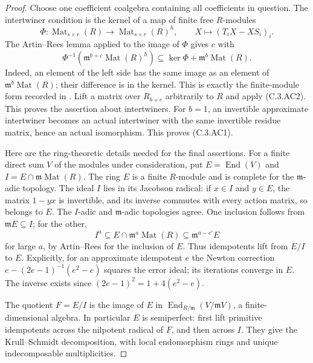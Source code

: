 \begin{proof}
Choose one coefficient coalgebra containing all coefficients in
question.  The intertwiner condition is the kernel of a map of
finite free $R$-modules
\[
 \Phi:\operatorname{Mat}_{s\times r}(R)
       \longrightarrow\operatorname{Mat}_{s\times r}(R)^h,
       \qquad X\longmapsto(T_iX-XS_i)_i.
\]
The Artin--Rees lemma applied to the image of $\Phi$ gives $c$ with
\[
 \Phi^{-1}(\mathfrak m^{b+c}\operatorname{Mat}(R)^h)
       \subseteq\ker\Phi+\mathfrak m^b\operatorname{Mat}(R).
                                                               \tag{C.3.AC2}
\]
Indeed, an element of the left side has the same image as an
element of $\mathfrak m^b\operatorname{Mat}(R)$; their difference
is in the kernel.  This is exactly the finite-module form recorded
in \cite[Section 15.4, Tag 07VD, introductory Artin--Rees
inclusion]{C-CompleteArtinRees}.
Lift a matrix over $R_{b+c}$ arbitrarily to $R$ and apply
(C.3.AC2).  This proves the assertion about intertwiners.
For $b=1$, an invertible approximate intertwiner becomes an
actual intertwiner with the same invertible residue matrix,
hence an actual isomorphism.  This proves (C.3.AC1).

Here are the ring-theoretic details needed for the final assertions.
For a finite direct sum $V$ of the modules under consideration, put
$E=\operatorname{End}(V)$ and
$I=E\cap\mathfrak m\operatorname{Mat}(R)$.
The ring $E$ is a finite $R$-module and is complete for the
$\mathfrak m$-adic topology.  The ideal $I$ lies in its Jacobson
radical: if $x\in I$ and $y\in E$, the matrix $1-yx$ is invertible,
and its inverse commutes with every action matrix, so belongs to
$E$.  The $I$-adic and $\mathfrak m$-adic topologies agree.  One
inclusion follows from $\mathfrak mE\subseteq I$; for the other,
\[
 I^a\subseteq E\cap\mathfrak m^a\operatorname{Mat}(R)
                  \subseteq\mathfrak m^{a-c'}E
\]
for large $a$, by Artin--Rees for the inclusion of $E$.
Thus idempotents lift from $E/I$ to $E$.  Explicitly, for an
approximate idempotent $e$ the Newton correction
$e-(2e-1)^{-1}(e^2-e)$ squares the error ideal; its iterations
converge in $E$.  The inverse exists since
$(2e-1)^2=1+4(e^2-e)$.

The quotient $F=E/I$ is the image of $E$ in
$\operatorname{End}_{R/\mathfrak m}(V/\mathfrak mV)$,
a finite-dimensional algebra.  In particular $E$ is semiperfect:
first lift primitive idempotents across the nilpotent radical of
$F$, and then across $I$.  They give the Krull--Schmidt
decomposition, with local endomorphism rings and unique
indecomposable multiplicities.


\end{proof}
